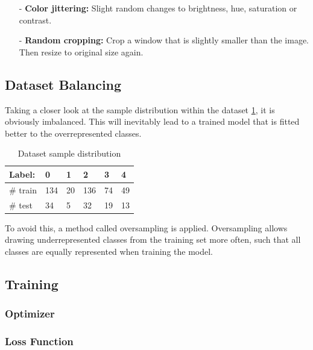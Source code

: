\documentclass{article}
\begin{document}
\begin{itemize}
\begin{itemize}
\begin{figure}[h]
\begin{minipage}[b]{.5\textwidth}
\begin{center}
          \captionsetup{justification=centering}
          \label{fig:IDRiD_graham}
          \end{center}
      \end{minipage}
  \end{figure} 
  \end{itemize}   
  \item[-] \textbf{Color jittering:} Slight random changes to brightness, hue, saturation or contrast.
  \item[-] \textbf{Random cropping:} Crop a window that is slightly smaller than the image. Then resize to original size again.
\end{itemize}

\subsection{Dataset Balancing}
Taking a closer look at the sample distribution within the dataset \ref{tab:table1}, it is obviously imbalanced. This will inevitably lead to a trained model
that is fitted better to the overrepresented classes.

\renewcommand{\arraystretch}{1.2}
\begin{table}[h]
  \centering
  \begin{tabular}{|l|l|l|l|l|l|}
  \hline
  Label:   & 0   & 1  & 2   & 3  & 4  \\ \hline
  \# train & 134 & 20 & 136 & 74 & 49 \\ \hline
  \# test  & 34  & 5  & 32  & 19 & 13 \\ \hline
  \end{tabular}
  \caption{Dataset sample distribution}
  \label{tab:table1}
  \end{table}

To avoid this, a method called oversampling is applied. Oversampling allows drawing underrepresented classes from the training set more often, 
such that all classes are equally represented when training the model.

\subsection{Training}
\subsubsection{Optimizer}
\subsubsection{Loss Function}
\end{document}
